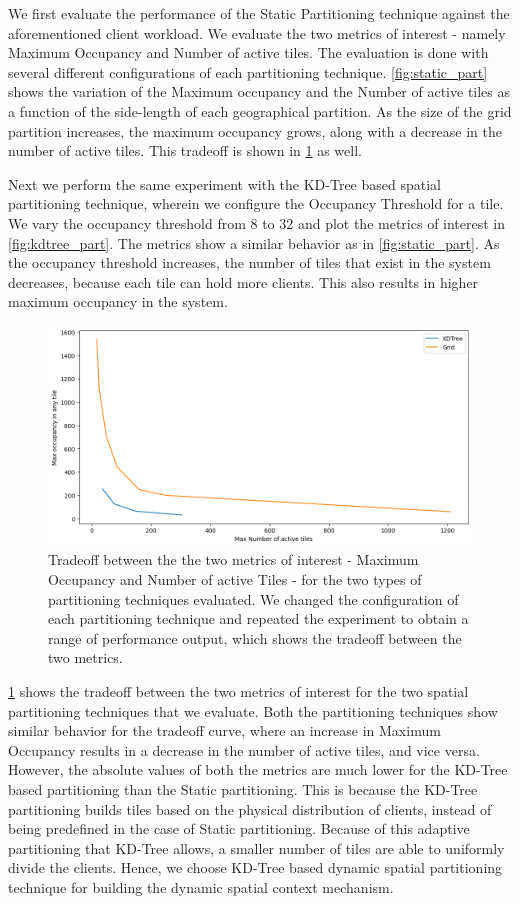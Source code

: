 We first evaluate the performance of the Static Partitioning technique against the aforementioned client workload. We evaluate the two metrics of interest - namely Maximum Occupancy and Number of active tiles. The evaluation is done with several different configurations of each partitioning technique. \cref{fig:static_part} shows the variation of the Maximum occupancy and the Number of active tiles as a function of the side-length of each geographical partition. As the size of the grid partition increases, the maximum occupancy grows, along with a decrease in the number of active tiles. This tradeoff is shown in \cref{fig:spatial_tradeoff} as well.
\par Next we perform the same experiment with the KD-Tree based spatial partitioning technique, wherein we configure the Occupancy Threshold for a tile. We vary the occupancy threshold from 8 to 32 and plot the metrics of interest in \cref{fig:kdtree_part}. The metrics show a similar behavior as in \cref{fig:static_part}. As the occupancy threshold increases, the number of tiles that exist in the system decreases, because each tile can hold more clients. This also results in higher maximum occupancy in the system.

\begin{figure}
\centering
\includegraphics[width=0.75\linewidth]{figures/design_space/spatial/spatial_partitioning_tradeoff.png}
\caption{Tradeoff between the the two metrics of interest - Maximum Occupancy and Number of active Tiles - for the two types of partitioning techniques evaluated. We changed the configuration of each partitioning technique and repeated the experiment to obtain a range of performance output, which shows the tradeoff between the two metrics.}
\label{fig:spatial_tradeoff}
\end{figure}

\cref{fig:spatial_tradeoff} shows the tradeoff between the two metrics of interest for the two spatial partitioning techniques that we evaluate. Both the partitioning techniques show similar behavior for the tradeoff curve, where an increase in Maximum Occupancy results in a decrease in the number of active tiles, and vice versa. However, the absolute values of both the metrics are much lower for the KD-Tree based partitioning than the Static partitioning. This is because the KD-Tree partitioning builds tiles based on the physical distribution of clients, instead of being predefined in the case of Static partitioning. Because of this adaptive partitioning that KD-Tree allows, a smaller number of tiles are able to uniformly divide the clients. Hence, we choose KD-Tree based dynamic spatial partitioning technique for building the dynamic spatial context mechanism.
